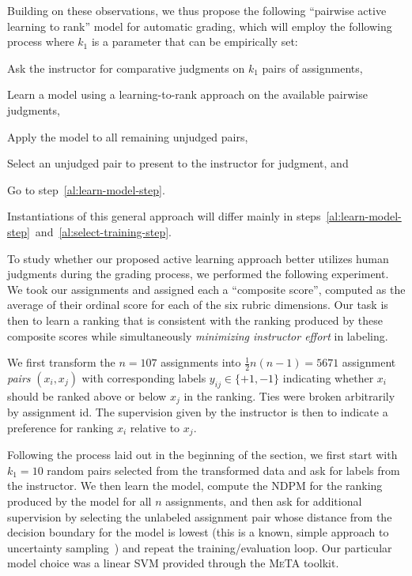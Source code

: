 Building on these observations, we thus propose the following ``pairwise active
learning to rank'' model for automatic grading, which will employ the
following process where $k_1$ is a parameter that can be empirically set:
\begin{enumerate*}[label=\itshape(\arabic*)\upshape]
  \item Ask the instructor for comparative judgments on $k_1$ pairs of
    assignments,

  \item Learn a model using a learning-to-rank approach on the available
    pairwise judgments\label{al:learn-model-step},

  \item Apply the model to all remaining unjudged pairs,

  \item Select an unjudged pair to present to the instructor for
    judgment\label{al:select-training-step}, and

  \item Go to step~\ref{al:learn-model-step}.
\end{enumerate*}
Instantiations of this general approach will differ mainly in
steps~\ref{al:learn-model-step}~and~\ref{al:select-training-step}.


To study whether our proposed active learning approach better utilizes
human judgments during the grading process, we performed the following
experiment. We took our assignments and assigned each a ``composite
score'', computed as the average of their ordinal score for each of the six
rubric dimensions. Our task is then to learn a ranking that is consistent
with the ranking produced by these composite scores while simultaneously
\emph{minimizing instructor effort} in labeling.

We first transform the $n = 107$ assignments into $\frac{1}{2}n(n-1) =
5671$ assignment \emph{pairs} $(x_i, x_j)$ with corresponding labels
$y_{ij} \in \{+1, -1\}$ indicating whether $x_i$ should be ranked above or
below $x_j$ in the ranking. Ties were broken arbitrarily by assignment id.
The supervision given by the instructor is then to indicate a preference
for ranking $x_i$ relative to $x_j$.

Following the process laid out in the beginning of the section, we first
start with $k_1 = 10$ random pairs selected from the transformed data and
ask for labels from the instructor. We then learn the model, compute the
NDPM for the ranking produced by the model for all $n$ assignments, and
then ask for additional supervision by selecting the unlabeled assignment
pair whose distance from the decision boundary for the model is lowest
(this is a known, simple approach to uncertainty
sampling~\cite{Settles:2012}) and repeat the training/evaluation loop. Our
particular model choice was a linear SVM provided through the \textsc{MeTA}
toolkit.

